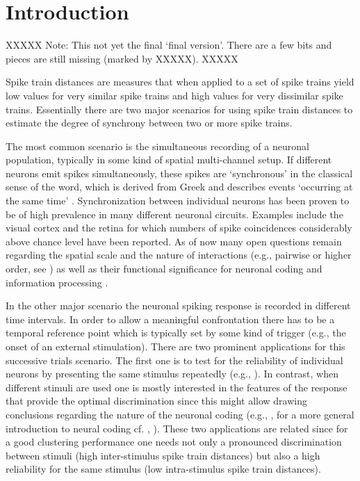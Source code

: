 \documentclass[10pt,twocolumn]{elsart5p}
\begin{document}
\section{\label{s:Intro} Introduction}

XXXXX Note: This not yet the final `final version'. There are a few bits and pieces are still missing (marked by XXXXX). XXXXX

Spike train distances are measures that when applied to a set of spike trains yield low values for very similar spike trains and high values for very dissimilar spike trains. Essentially there are two major scenarios for using spike train distances to estimate the degree of synchrony between two or more spike trains.

The most common scenario is the simultaneous recording of a neuronal population, typically in some kind of spatial multi-channel setup. If different neurons emit spikes simultaneously, these spikes are `synchronous' in the classical sense of the word, which is derived from Greek and describes events `occurring at the same time' \citep{Pikovsky01}. Synchronization between individual neurons has been proven to be of high prevalence in many different neuronal circuits. Examples include the visual cortex \citep{Tiesinga08} and the retina \citep{Shlens08} for which numbers of spike coincidences considerably above chance level have been reported. As of now many open questions remain regarding the spatial scale and the nature of interactions (e.g., pairwise or higher order, see \citep{Nirenberg07}) as well as their functional significance for neuronal coding and information processing \citep{Kumar10}.

In the other major scenario the neuronal spiking response is recorded in different time intervals. In order to allow a meaningful confrontation there has to be a temporal reference point which is typically set by some kind of trigger (e.g., the onset of an external stimulation). There are two prominent applications for this successive trials scenario. The first one is to test for the reliability of individual neurons by presenting the same stimulus repeatedly (e.g., \citet{Mainen95}). In contrast, when different stimuli are used one is mostly interested in the features of the response that provide the optimal discrimination since this might allow drawing conclusions regarding the nature of the neuronal coding (e.g., \citet{Victor05}, for a more general introduction to neural coding cf. \citeauthor{QuianQuiroga02b}, \citeyear{QuianQuiroga02b}). These two applications are related since for a good clustering performance one needs not only a pronounced discrimination between stimuli (high inter-stimulus spike train distances) but also a high reliability for the same stimulus (low intra-stimulus spike train distances).
\end{document}

